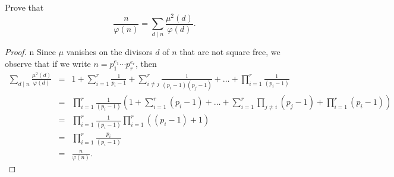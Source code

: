 \documentclass[10pt]{amsart}
\begin{document}
\begin{thm}
  Prove that 
  $$\frac{n}{\varphi(n)} = \sum_{d \mid n} \frac{\mu^2(d)}{\varphi(d)}.$$
  
  \begin{proof}n
    Since $\mu$ vanishes on the divisors $d$ of $n$ that are not square free, we observe that if we write $n = p_1^{e_1} \cdots p_r^{e_r}$, then
    \begin{eqnarray*}
      \sum_{d \mid n} \frac{\mu^2(d)}{\varphi(d)} &=& 1 + \sum_{i=1}^r \frac{1}{p_i - 1} + \sum_{i \neq j}^r \frac{1}{(p_i - 1)(p_j - 1)} + \ldots + \prod_{i = 1}^r \frac{1}{(p_i - 1)}\\
      &=& \prod_{i = 1}^r \frac{1}{(p_i - 1)}\left(1 + \sum_{i=1}^r (p_i - 1) + \ldots + \sum_{i = 1}^r \prod_{j \neq i} (p_j - 1) + \prod_{i=1}^r (p_i - 1)\right)\\
      &=& \prod_{i = 1}^r \frac{1}{(p_i - 1)} \prod_{i = 1}^r \left((p_i - 1) + 1\right)\\
      &=& \prod_{i = 1}^r \frac{p_i}{(p_i - 1)}\\
      &=& \frac{n}{\varphi(n)}.
    \end{eqnarray*}
  \end{proof}
\end{thm}
\end{document}
